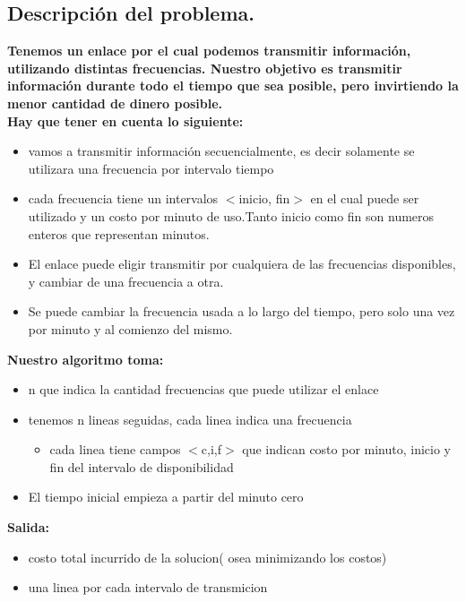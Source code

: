 \subsection{Descripción del problema.}

\vspace*{0.3cm}

\textbf{
Tenemos un enlace por el cual podemos transmitir información, utilizando distintas frecuencias.
Nuestro objetivo es transmitir información durante todo el tiempo que sea posible, pero invirtiendo la menor cantidad de dinero posible.
\\
Hay que tener en cuenta lo siguiente:
}
\begin{itemize}
	\item vamos a transmitir información secuencialmente, es decir solamente se utilizara una frecuencia por intervalo tiempo 
	\item cada frecuencia tiene un intervalos $<$inicio, fin$>$ en el cual puede ser utilizado y un costo por minuto de uso.Tanto inicio como fin son numeros enteros que representan minutos. 
	\item El enlace puede eligir transmitir por cualquiera de las frecuencias disponibles, y cambiar de una frecuencia a otra.
	\item Se puede cambiar la frecuencia usada a lo largo del tiempo, pero solo una vez por minuto y al comienzo del mismo.
\end{itemize}

\textbf{Nuestro algoritmo toma:}
\begin{itemize}
	\item n que indica la cantidad frecuencias que puede utilizar el enlace
	\item tenemos n lineas seguidas, cada linea indica una frecuencia
	\begin{itemize}
		\item cada linea tiene campos $<$c,i,f$>$ que indican costo por minuto, inicio y fin del intervalo de disponibilidad
	\end{itemize}
	\item El tiempo inicial empieza a partir del minuto cero
\end{itemize}

\textbf{Salida:}
\begin{itemize}
	  \item costo total incurrido de la solucion( osea minimizando los costos)
	  \item una linea por cada intervalo de transmicion 
\end{itemize}

